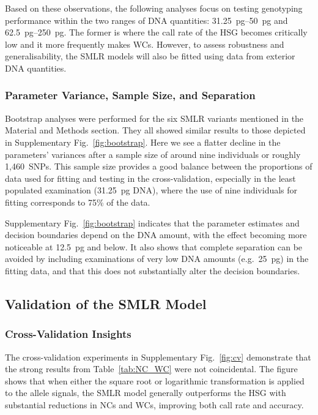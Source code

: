 \documentclass[preprint,5p,times,11pt]{elsarticle}
\begin{document}
Based on these observations, the following analyses focus on testing genotyping performance within the two ranges of DNA quantities: \SIrange[range-units = single, range-phrase = --]{31.25}{50}{\pg} and \SIrange[range-units = single, range-phrase = --]{62.5}{250}{\pg}.
The former is where the call rate of the HSG becomes critically low and it more frequently makes WCs.
However, to assess robustness and generalisability, the SMLR models will also be fitted using data from exterior DNA quantities.


\subsubsection{Parameter Variance, Sample Size, and Separation}
Bootstrap analyses were performed for the six SMLR variants mentioned in the Material and Methods section.
They all showed similar results to those depicted in Supplementary Fig.~\ref{fig:bootstrap}.
Here we see a flatter decline in the parameters’ variances after a sample size of around nine individuals or roughly 1,460~SNPs.
This sample size provides a good balance between the proportions of data used for fitting and testing in the cross-validation, especially in the least populated examination (\SI{31.25}{\pg} DNA), where the use of nine individuals for fitting corresponds to 75\% of the data.

Supplementary Fig.~\ref{fig:bootstrap} indicates that the parameter estimates and decision boundaries depend on the DNA amount, with the effect becoming more noticeable at \SI{12.5}{\pg} and below.
It also shows that complete separation can be avoided by including examinations of very low DNA amounts (e.g.~\SI{25}{\pg}) in the fitting data, and that this does not substantially alter the decision boundaries.


\subsection{Validation of the SMLR Model}
\subsubsection{Cross-Validation Insights}
The cross-validation experiments in Supplementary Fig.~\ref{fig:cv} demonstrate that the strong results from Table~\ref{tab:NC_WC} were not coincidental.
The figure shows that when either the square root or logarithmic transformation is applied to the allele signals, the SMLR model generally outperforms the HSG with substantial reductions in NCs and WCs, improving both call rate and accuracy.
\end{document}
